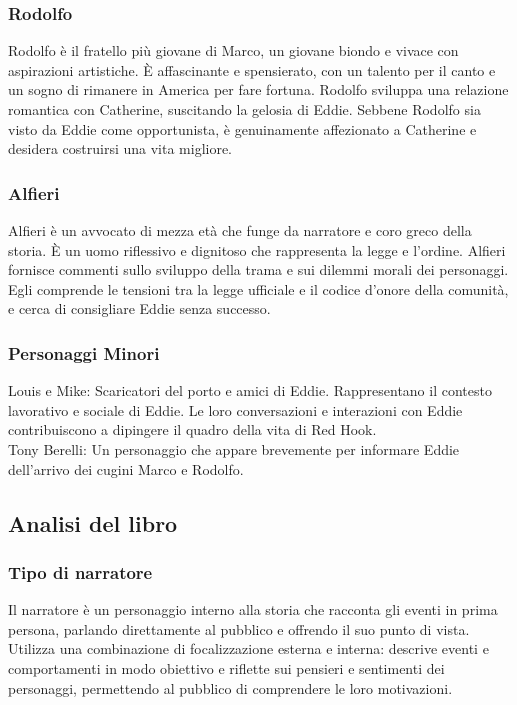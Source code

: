 \documentclass{article}
\begin{document}
\subsubsection{Rodolfo}
Rodolfo è il fratello più giovane di Marco, un giovane biondo e vivace con aspirazioni
artistiche. È affascinante e spensierato, con un talento per il canto e un sogno di rimanere
in America per fare fortuna. Rodolfo sviluppa una relazione romantica con Catherine, suscitando
la gelosia di Eddie. Sebbene Rodolfo sia visto da Eddie come opportunista, è genuinamente
affezionato a Catherine e desidera costruirsi una vita migliore.

\subsubsection{Alfieri}
Alfieri è un avvocato di mezza età che funge da narratore e coro greco della storia. È un uomo
riflessivo e dignitoso che rappresenta la legge e l'ordine. Alfieri fornisce commenti sullo
sviluppo della trama e sui dilemmi morali dei personaggi. Egli comprende le tensioni tra la
legge ufficiale e il codice d'onore della comunità, e cerca di consigliare Eddie senza successo.

\subsubsection{Personaggi Minori}
Louis e Mike: Scaricatori del porto e amici di Eddie. Rappresentano il contesto lavorativo e
sociale di Eddie. Le loro conversazioni e interazioni con Eddie contribuiscono a dipingere il
quadro della vita di Red Hook.
\\
Tony Berelli: Un personaggio che appare brevemente per informare Eddie dell'arrivo dei cugini
Marco e Rodolfo.

\subsection{Analisi del libro}

\subsubsection{Tipo di narratore}
Il narratore è un personaggio interno alla storia che racconta gli eventi in prima persona,
parlando direttamente al pubblico e offrendo il suo punto di vista. Utilizza una combinazione
di focalizzazione esterna e interna: descrive eventi e comportamenti in modo obiettivo e
riflette sui pensieri e sentimenti dei personaggi, permettendo al pubblico di comprendere le
loro motivazioni.
\end{document}

